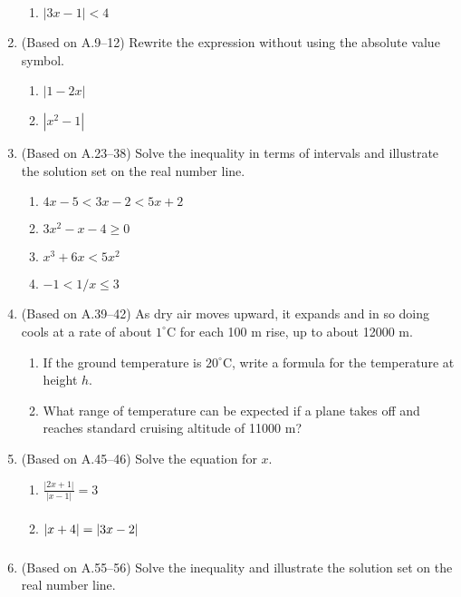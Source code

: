 \documentclass[11pt]{article}
\newcommand{\ds}{\displaystyle}
\begin{document}
\begin{enumerate}
\begin{multicols}{4}
\begin{enumerate}
  \item $\ds |3x-1|<4$
  \end{enumerate}
  \end{multicols}
\item (Based on A.9--12) Rewrite the expression without using the
  absolute value symbol.
  \begin{multicols}{2}
  \begin{enumerate}
  \item $\ds |1-2x|$
  \item $\ds |x^2-1|$
  \end{enumerate}
  \end{multicols}
\item (Based on A.23--38) Solve the inequality in terms of intervals
  and illustrate the solution set on the real number line.
  \begin{multicols}{4}
  \begin{enumerate}
  \item $\ds 4x-5 < 3x-2 < 5x+2$
  \item $\ds 3x^2-x-4 \ge 0$
  \item $\ds x^3+6x<5x^2$
  \item $\ds -1<1/x\le 3$
  \end{enumerate}
  \end{multicols}
\item (Based on A.39--42) As dry air moves upward, it expands and in
  so doing cools at a rate of about $1^{\circ}$C for each 100 m rise,
  up to about 12000 m.
  \begin{enumerate}
  \item If the ground temperature is $20^{\circ}$C, write a formula
    for the temperature at height $h$.
  \item What range of temperature can be expected if a plane takes off
    and reaches standard cruising altitude of 11000 m?
  \end{enumerate}
\item (Based on A.45--46) Solve the equation for $x$.
  \begin{multicols}{2}
  \begin{enumerate}
  \item $\ds \frac{|2x+1|}{|x-1|}=3$
  \item $\ds\vphantom{\frac{|x|}{|x|}} |x+4| = |3x-2|$
  \end{enumerate}
  \end{multicols}
\item (Based on A.55--56) Solve the inequality and illustrate the
  solution set on the real number line.

\end{enumerate}
\end{document}
